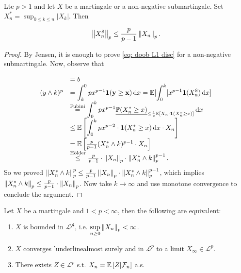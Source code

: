 \documentclass{article}
\begin{document}
\begin{theorem}\label{thm: doob L1 ineq disc}
Lte $ p>1$ and let $ X$ be a martingale or a non-negative submartingale. Set $ X^{*}_{n} = \displaystyle\sup_{0\leq k \leq n }|X_{k}|$. Then 

\[
	\left\lVert X^{8}_{n}\right\rVert_{p}\leq \frac{p}{p-1}\left\lVert X_{n}\right\rVert_{p}.\label{eq: doob L1 disc}
\]

\end{theorem}

\begin{proof}
	By Jensen, it is enough to prove  \ref{eq: doob L1 disc} for a non-negative submartingale. Now, observe that 

	\[
	\begin{array}{ll}
	     &= b \\
		(y\land k)^{p} &= \displaystyle\int_{k}^{0} px^{p-1} \mathbf{1(y\geq x)}\operatorname{d}\! x  
			       =\mathbb{E}[ \displaystyle\int_{0}^{k}[x^{p-1} \mathbf{1}(X^{8}_{n}) \operatorname{d}\! x  ]\\ 
			       &\stackrel{\text{Fubini}}{=} \displaystyle\int_{0}^{k} px^{p-1}\underline{\mathbb{P}(X^{*}_{n}\geq x)}_{\leq \frac{1}{x}  \mathbb{E}\left[ X_{n}\cdot \mathbf{1}(X^{*}_{n}\geq x) \right] }\operatorname{d}\! x \\ 
			       &\leq \mathbb{E}\left[ \displaystyle\int_{0}^{k} px^{p-2}\cdot \mathbf{ 1}(X^{*}_{n}\geq x) \operatorname{d}\!  x \cdot X_{n} \right] \\ 
			       &= \mathbb{E}\left[ \frac{p}{p-1}(X^{*}_{n}\land k)^{p-1}\cdot X_{n} \right]\\ 
			       &\stackrel{\text{H\"{o}lder}}{\leq} \frac{p}{p-1}\cdot \left\lVert X_{n}\right\rVert_{p}\cdot \left\lVert X^{*}_{n}\land k\right\rVert^{p-1}_{p}. 
	\end{array}
	\]
	So we proved $ \left\lVert X^{*}_{n}\land k\right\rVert^{p}_{p}\leq \frac{p}{p-1}\left\lVert X_{n}\right\rVert_{p}\cdot\left\lVert X^{*}_{n}\land k\right\rVert^{p-1}_{p}$, which implies $ \left\lVert X^{*}_{n}\land k\right\rVert_{p}\leq \frac{p}{p-1}\cdot \left\lVert X_{n}\right\rVert_{p}$. Now take $ k\to \infty$ and use monotone convergence to conclude the argument.
\end{proof}



\begin{theorem}\label{thm: Lp convergence theorem discrete}
	Let $ X$ be a martingale and $ 1<p<\infty$, then the following are equivalent: 

	\begin{enumerate}
		\item $ X$ is bounded in $ \mathcal{L^{p}}$, i.e. $ \displaystyle\sup_{n\geq 0}\left\lVert X_{n}\right\rVert_{p}<\infty $.
		\item $ X$ converges 'underline{almost surely} and in $ \mathcal{L}^{p}$ to a limit $ X_{\infty}\in \mathcal{L}^{p}$.
		\item There exists $ Z\in \mathcal{L}^{p} $ s.t. $ X_{n} = \mathbb{E}\left[Z | \mathcal{F}_{n}  \right]$ a.s.
	\end{enumerate}
	
\end{theorem}
\end{document}
